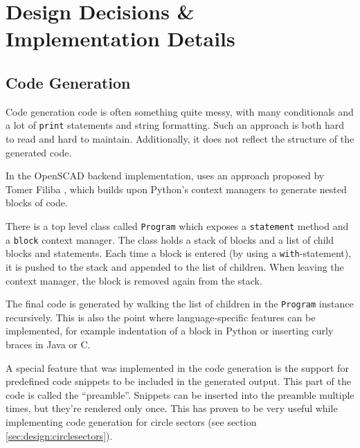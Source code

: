 
\chapter{Design Decisions \& Implementation Details}

\label{ch:design}


\section{Code Generation} \label{sec:design:codegen}

Code generation code is often something quite messy, with many conditionals and
a lot of \texttt{print} statements and string formatting. Such an approach is
both hard to read and hard to maintain. Additionally, it does not reflect the
structure of the generated code.

In the OpenSCAD backend implementation, \tangible{} uses an approach proposed by
Tomer Filiba \cite{filiba:2012}, which builds upon Python's context managers to
generate nested blocks of code.


There is a top level class called \texttt{Program} which exposes a
\texttt{statement} method and a \texttt{block} context manager. The class holds
a stack of blocks and a list of child blocks and statements. Each time a block
is entered (by using a \texttt{with}-statement), it is pushed to the stack and
appended to the list of children. When leaving the context manager, the block is
removed again from the stack.

The final code is generated by walking the list of children in the
\texttt{Program} instance recursively. This is also the point where
language-specific features can be implemented, for example indentation of a
block in Python or inserting curly braces in Java or C.

A special feature that was implemented in the code generation is the support for
predefined code snippets to be included in the generated output. This part of
the code is called the ``preamble''. Snippets can be inserted into the preamble
multiple times, but they're rendered only once. This has proven to be very
useful while implementing code generation for circle sectors (see section
\ref{sec:design:circlesectors}).

